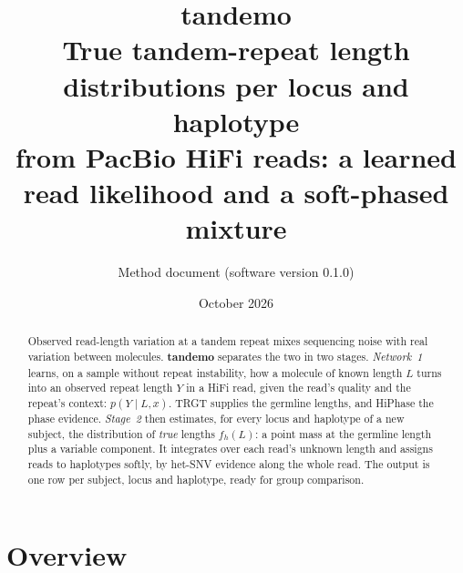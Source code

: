 \documentclass[10pt,a4paper]{article}
\title{\textbf{tandemo}\\[2pt]\large True tandem-repeat length distributions per locus and haplotype\\
from PacBio HiFi reads: a learned read likelihood and a soft-phased mixture}
\author{Method document \quad\small(software version 0.1.0)}
\date{\small October 2026}
\begin{document}
\maketitle

\begin{abstract}
\noindent Observed read-length variation at a tandem repeat mixes sequencing noise with real variation between
molecules. \textbf{tandemo} separates the two in two stages. \emph{Network~1} learns, on a sample without repeat
instability, how a molecule of known length $L$ turns into an observed repeat length $Y$ in a HiFi read, given the
read's quality and the repeat's context: $p(Y\mid L,x)$. TRGT supplies the germline lengths, and HiPhase the phase
evidence. \emph{Stage~2} then estimates, for every locus and haplotype of a new subject, the distribution of
\emph{true} lengths $f_h(L)$: a point mass at the germline length plus a variable component. It integrates over
each read's unknown length and assigns reads to haplotypes softly, by het-SNV evidence along the whole read. The
output is one row per subject, locus and haplotype, ready for group comparison.
\end{abstract}

\tableofcontents
\bigskip

\section{Overview}
\end{document}
